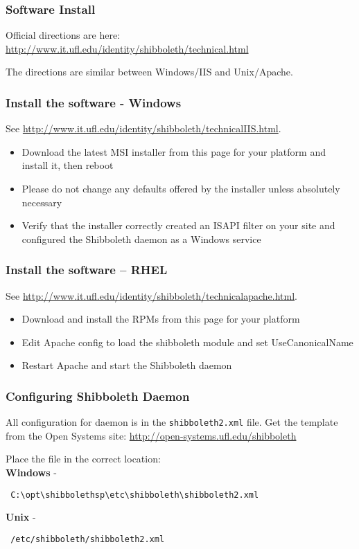 \documentclass[hyperref={colorlinks=true},professionalfonts]{beamer}
\begin{document}
\begin{frame}
\frametitle{Software Install}
Official directions are here: \\
{\small \url{http://www.it.ufl.edu/identity/shibboleth/technical.html}}

\bigskip
The directions are similar between Windows/IIS and Unix/Apache.
\end{frame}

\begin{frame}
\frametitle{Install the software - Windows}
{\tiny See \url{http://www.it.ufl.edu/identity/shibboleth/technicalIIS.html}.}

\begin{itemize}
\item Download the latest MSI installer from this page for your platform and install it, then reboot
\item Please do not change any defaults offered by the installer unless absolutely necessary
\item Verify that the installer correctly created an ISAPI filter on your site and configured the Shibboleth daemon as a Windows service
\end{itemize}

\end{frame}

\begin{frame}
\frametitle{Install the software – RHEL}
{\tiny See \url{http://www.it.ufl.edu/identity/shibboleth/technicalapache.html}.}

\begin{itemize}
\item Download and install the RPMs from this page for your platform
\item Edit Apache config to load the shibboleth module and set UseCanonicalName
\item Restart Apache and start the Shibboleth daemon
\end{itemize}

\end{frame}

\begin{frame}[fragile]
\frametitle{Configuring Shibboleth Daemon}
All configuration for daemon is in the \texttt{shibboleth2.xml} file. Get the template from the Open Systems site:
\url{http://open-systems.ufl.edu/shibboleth}
\bigskip

Place the file in the correct location: \\ \bigskip
\textbf{Windows} - \begin{verbatim} C:\opt\shibbolethsp\etc\shibboleth\shibboleth2.xml \end{verbatim}
\textbf{Unix} - \begin{verbatim} /etc/shibboleth/shibboleth2.xml \end{verbatim}
\end{frame}
\end{document}
